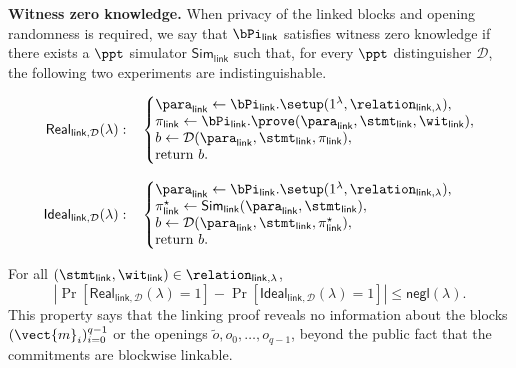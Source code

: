 \noindent\textbf{Witness zero knowledge.}
When privacy of the linked blocks and opening randomness is required, we say
that \(\bPi_{\mathsf{link}}\) satisfies witness zero knowledge if there exists a
\(\ppt\) simulator \(\mathsf{Sim}_{\mathsf{link}}\) such that, for every
\(\ppt\) distinguisher \(\mathcal{D}\), the following two experiments are
indistinguishable.

\[
\begin{aligned}
\mathsf{Real}_{\mathsf{link},\mathcal{D}}(\lambda):
\quad
&\left\{
\begin{array}{@{}l@{}}
  \para_{\mathsf{link}}
    \gets
    \bPi_{\mathsf{link}}.\setup(
      1^\lambda,\relation_{\mathsf{link},\lambda}
    ),\\
  \pi_{\mathsf{link}}
    \gets
    \bPi_{\mathsf{link}}.\prove(
      \para_{\mathsf{link}},
      \stmt_{\mathsf{link}},
      \wit_{\mathsf{link}}
    ),\\
  b\gets
    \mathcal{D}(
      \para_{\mathsf{link}},
      \stmt_{\mathsf{link}},
      \pi_{\mathsf{link}}
    ),\\
  \text{return } b.
\end{array}
\right.
\\[3mm]
\mathsf{Ideal}_{\mathsf{link},\mathcal{D}}(\lambda):
\quad
&\left\{
\begin{array}{@{}l@{}}
  \para_{\mathsf{link}}
    \gets
    \bPi_{\mathsf{link}}.\setup(
      1^\lambda,\relation_{\mathsf{link},\lambda}
    ),\\
  \pi_{\mathsf{link}}^\star
    \gets
    \mathsf{Sim}_{\mathsf{link}}(
      \para_{\mathsf{link}},
      \stmt_{\mathsf{link}}
    ),\\
  b\gets
    \mathcal{D}(
      \para_{\mathsf{link}},
      \stmt_{\mathsf{link}},
      \pi_{\mathsf{link}}^\star
    ),\\
  \text{return } b.
\end{array}
\right.
\end{aligned}
\]

For all
\((\stmt_{\mathsf{link}},\wit_{\mathsf{link}})
\in\relation_{\mathsf{link},\lambda}\),
\[
\left|
  \Pr[\mathsf{Real}_{\mathsf{link},\mathcal{D}}(\lambda)=1]
  -
  \Pr[\mathsf{Ideal}_{\mathsf{link},\mathcal{D}}(\lambda)=1]
\right|
\le
\textsf{negl}(\lambda).
\]
This property says that the linking proof reveals no information about
the blocks \((\vect{m}_i)_{i=0}^{q-1}\) or the openings
\(\widetilde{o},o_0,\ldots,o_{q-1}\), beyond the public fact that the
commitments are blockwise linkable.




